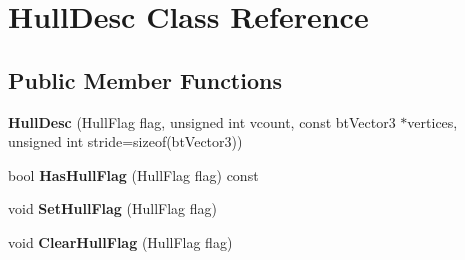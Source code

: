 \hypertarget{class_hull_desc}{\section{Hull\+Desc Class Reference}
\label{class_hull_desc}
}
\subsection*{Public Member Functions}
\begin{DoxyCompactItemize}
\item 
\hypertarget{class_hull_desc_a024e00a7890b4823597f00d5dbee16ac}{{\bfseries Hull\+Desc} (Hull\+Flag flag, unsigned int vcount, const bt\+Vector3 $\ast$vertices, unsigned int stride=sizeof(bt\+Vector3))}\label{class_hull_desc_a024e00a7890b4823597f00d5dbee16ac}

\item 
\hypertarget{class_hull_desc_ae4797848199f6553b1bd7a66c3158897}{bool {\bfseries Has\+Hull\+Flag} (Hull\+Flag flag) const }\label{class_hull_desc_ae4797848199f6553b1bd7a66c3158897}

\item 
\hypertarget{class_hull_desc_afe1e5a82f88b98999295d410b33b25f0}{void {\bfseries Set\+Hull\+Flag} (Hull\+Flag flag)}\label{class_hull_desc_afe1e5a82f88b98999295d410b33b25f0}

\item 
\hypertarget{class_hull_desc_aac16be27dd531c40d2b76ac0f990a788}{void {\bfseries Clear\+Hull\+Flag} (Hull\+Flag flag)}\label{class_hull_desc_aac16be27dd531c40d2b76ac0f990a788}

\end{DoxyCompactItemize}
